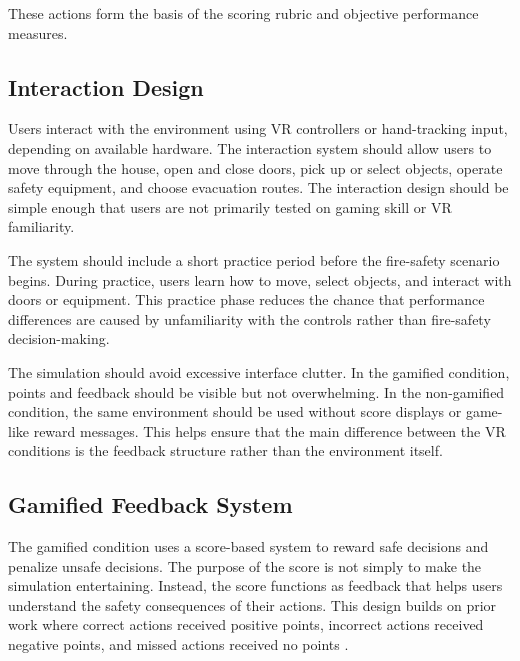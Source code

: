 \documentclass[manuscript, review]{acmart}
\begin{document}
{These actions form the basis of the scoring rubric and objective performance measures.

\subsection{Interaction Design}

Users interact with the environment using VR controllers or hand-tracking input, depending on available hardware. The interaction system should allow users to move through the house, open and close doors, pick up or select objects, operate safety equipment, and choose evacuation routes. The interaction design should be simple enough that users are not primarily tested on gaming skill or VR familiarity.

The system should include a short practice period before the fire-safety scenario begins. During practice, users learn how to move, select objects, and interact with doors or equipment. This practice phase reduces the chance that performance differences are caused by unfamiliarity with the controls rather than fire-safety decision-making.

The simulation should avoid excessive interface clutter. In the gamified condition, points and feedback should be visible but not overwhelming. In the non-gamified condition, the same environment should be used without score displays or game-like reward messages. This helps ensure that the main difference between the VR conditions is the feedback structure rather than the environment itself.

\subsection{Gamified Feedback System}

The gamified condition uses a score-based system to reward safe decisions and penalize unsafe decisions. The purpose of the score is not simply to make the simulation entertaining. Instead, the score functions as feedback that helps users understand the safety consequences of their actions. This design builds on prior work where correct actions received positive points, incorrect actions received negative points, and missed actions received no points \cite{somerkoski2020digital}.

}
\end{document}
